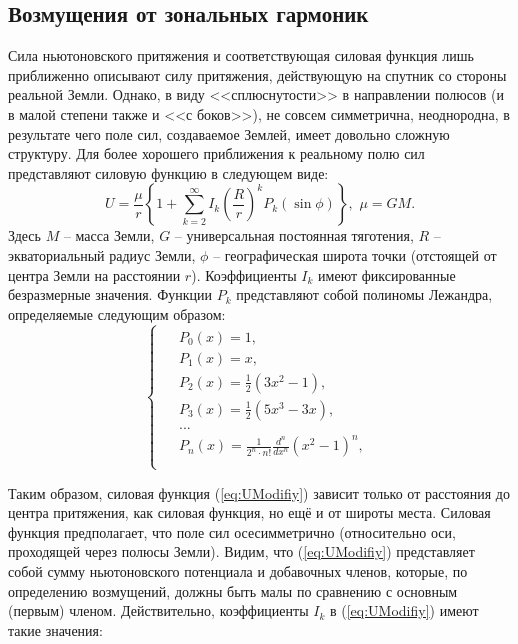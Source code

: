 \subsection{Возмущения от зональных гармоник}
\noindent\indent Сила ньютоновского притяжения и соответствующая силовая функция
лишь приближенно описывают силу притяжения, действующую на спутник со стороны
реальной Земли. Однако, в виду <<сплюснутости>> в направлении полюсов (и в малой
степени также и <<с боков>>), не совсем симметрична, неоднородна, в результате
чего поле сил, создаваемое Землей, имеет довольно сложную структуру. Для более
хорошего приближения к реальному полю сил представляют силовую функцию в следующем виде:
\begin{equation} \label{eq:UModifiy}
  U = \frac{\mu}{r}\left\{1 + \sum\limits_{k=2}^{\infty}I_k\left(\frac{R}{r}\right)^kP_k(\sin\phi)\right\},\,\,
  \mu = GM.
\end{equation}
Здесь $M$ -- масса Земли, $G$ -- универсальная постоянная тяготения, $R$ -- экваториальный
радиус Земли, $\phi$ -- географическая широта точки (отстоящей от центра Земли на
расстоянии $r$). Коэффициенты $I_k$ имеют фиксированные безразмерные значения.
Функции $P_k$ представляют собой полиномы Лежандра, определяемые следующим образом:
\begin{equation}
  \begin{cases}
    \begin{aligned}
      & P_0(x) = 1, \\
      & P_1(x) = x, \\
      & P_2(x) = \frac{1}{2}(3x^2 - 1), \\
      & P_3(x) = \frac{1}{2}(5x^3 - 3x), \\
      & ...\\
      & P_n(x) = \frac{1}{2^n \cdot n!}\frac{d^n}{dx^n}(x^2 - 1)^n, \\
    \end{aligned}
  \end{cases}
\end{equation}\par
Таким образом, силовая функция (\ref{eq:UModifiy}) зависит только от расстояния
до центра притяжения, как силовая функция, но ещё и от широты места. Силовая
функция предполагает, что поле сил осесимметрично (относительно оси, проходящей
через полюсы Земли). Видим, что (\ref{eq:UModifiy}) представляет собой сумму
ньютоновского потенциала и добавочных членов, которые, по определению возмущений,
должны быть малы по сравнению с основным (первым) членом. Действительно,
коэффициенты $I_k$ в (\ref{eq:UModifiy}) имеют такие значения:
